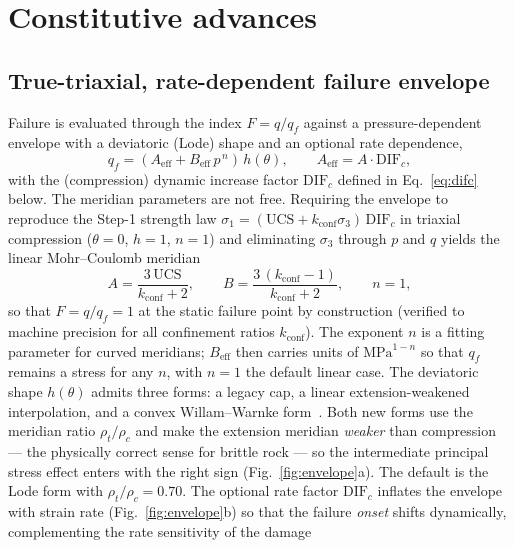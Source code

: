 \documentclass[11pt]{article}
\begin{document}
\section{Constitutive advances}\label{sec:advances}

\subsection{True-triaxial, rate-dependent failure envelope}\label{sec:env}

Failure is evaluated through the index $F=q/q_f$ against a pressure-dependent
envelope with a deviatoric (Lode) shape and an optional rate dependence,
\begin{equation}
q_f=(A_{\mathrm{eff}}+B_{\mathrm{eff}}\,p^{\,n})\,h(\theta),\qquad
A_{\mathrm{eff}}=A\cdot\mathrm{DIF}_c,
\label{eq:qf}
\end{equation}
with the (compression) dynamic increase factor $\mathrm{DIF}_c$ defined in
Eq.~\eqref{eq:difc} below.
The meridian parameters are not free. Requiring the envelope to reproduce the
Step-1 strength law $\sigma_1=(\mathrm{UCS}+k_{\mathrm{conf}}\sigma_3)\,\mathrm{DIF}_c$
in triaxial compression ($\theta=0$, $h=1$, $n=1$) and eliminating $\sigma_3$
through $p$ and $q$ yields the linear Mohr--Coulomb meridian
\begin{equation}
A=\frac{3\,\mathrm{UCS}}{k_{\mathrm{conf}}+2},\qquad
B=\frac{3\,(k_{\mathrm{conf}}-1)}{k_{\mathrm{conf}}+2},\qquad n=1,
\label{eq:AB}
\end{equation}
so that $F=q/q_f=1$ at the static failure point by construction (verified to
machine precision for all confinement ratios $k_{\mathrm{conf}}$). The exponent
$n$ is a fitting parameter for curved meridians; $B_{\mathrm{eff}}$ then carries
units of $\mathrm{MPa}^{1-n}$ so that $q_f$ remains a stress for any $n$, with
$n=1$ the default linear case. The deviatoric shape $h(\theta)$ admits three forms: a legacy cap, a
linear extension-weakened interpolation, and a convex Willam--Warnke
form~\citep{willam1975}. Both new forms use the meridian ratio $\rho_t/\rho_c$
and make the extension meridian \emph{weaker} than compression --- the physically
correct sense for brittle rock --- so the intermediate principal stress effect
enters with the right sign (Fig.~\ref{fig:envelope}a). The default is the Lode
form with $\rho_t/\rho_c=0.70$. The optional rate factor $\mathrm{DIF}_c$ inflates
the envelope with strain rate (Fig.~\ref{fig:envelope}b) so that the failure
\emph{onset} shifts dynamically, complementing the rate sensitivity of the damage
\end{document}
